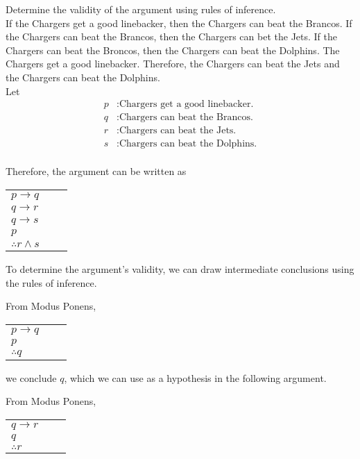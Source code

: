Determine the validity of the argument using rules of inference.\\

If the Chargers get a good linebacker, then the Chargers can beat the Brancos.  If the Chargers can beat the Brancos, then the Chargers can bet the Jets.  If the Chargers can beat the Broncos, then the Chargers can beat the Dolphins.  The Chargers get a good linebacker.  Therefore, the Chargers can beat the Jets and the Chargers can beat the Dolphins.\\

Let
\begin{align*}
p&: \text{Chargers get a good linebacker.}\\
q&: \text{Chargers can beat the Brancos.}\\
r&: \text{Chargers can beat the Jets.}\\
s&: \text{Chargers can beat the Dolphins.}\\
\end{align*}

Therefore, the argument can be written as

\begin{table}[h]
\centering
\begin{tabular}{l@{\,}l@{\,}l@{\,}}
$p \rightarrow q$ & & \\
$q \rightarrow r$ & & \\
$q \rightarrow s$ & & \\
$p$ & & \\
\hline
$\therefore r \land s$ & &
\end{tabular}
\end{table}

To determine the argument's validity, we can draw intermediate conclusions using the rules of inference.

\clearpage

From Modus Ponens,

\begin{table}[h]
\centering
\begin{tabular}{l@{\,}l@{\,}l@{\,}}
$p \rightarrow q$ & & \\
$p$ & & \\
\hline
$\therefore q$ & &
\end{tabular}
\end{table}

we conclude $q$, which we can use as a hypothesis in the following argument.

From Modus Ponens,

\begin{table}[h]
\centering
\begin{tabular}{l@{\,}l@{\,}l@{\,}}
$q \rightarrow r$ & & \\
$q$ & & \\
\hline
$\therefore r$ & &
\end{tabular}
\end{table}

